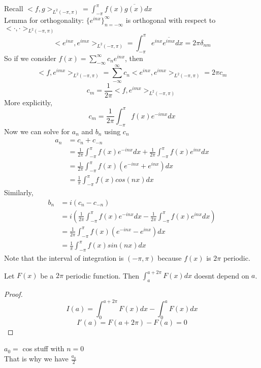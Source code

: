 \documentclass[answers,12pt,addpoints]{exam}
\begin{document}
Recall $<f,g>_{L^2(-\pi,\pi)} = \int_{-\pi}^{\pi} f(x) \overline{g(x)} dx$\\
Lemma for orthogonality: $\{e^{inx}\}_{n=-\infty}^{\infty}$ is orthogonal with respect to $<\cdot, \cdot>_{L^2(-\pi, \pi)}$\\
$$<e^{inx}, e^{imx}>_{L^2(-\pi, \pi)} = \int_{-\pi}^{\pi} e^{inx} \overline{e^{imx}} dx = 2\pi \delta_{nm}$$
So if we consider $f(x) = \sum_{-\infty}^{\infty} c_n e^{inx}$, then \\
$$ <f, e^{imx}>_{L^2(-\pi, \pi)} = \sum_{-\infty}^{\infty} c_n <e^{inx}, e^{imx}>_{L^2(-\pi, \pi)} = 2\pi c_m$$
$$c_m = \frac{1}{2\pi} <f, e^{imx}>_{L^2(-\pi, \pi)}$$
More explicitly, 
$$c_m = \frac{1}{2\pi} \int_{-\pi}^{\pi} f(x) e^{-imx} dx$$
Now we can solve for $a_n$ and $b_n$ using $c_n$\\
\begin{align*}
    a_n &= c_n + c_{-n}\\ 
    &= \frac{1}{2\pi} \int_{-\pi}^{\pi} f(x) e^{-inx} dx + \frac{1}{2\pi} \int_{-\pi}^{\pi} f(x) e^{inx} dx\\
    &= \frac{1}{2\pi} \int_{-\pi}^{\pi} f(x) (e^{-inx} + e^{inx}) dx\\
    &= \frac{1}{\pi} \int_{-\pi}^{\pi} f(x) cos(nx) dx
\end{align*}
Similarly,
\begin{align*}
    b_n &= i(c_n - c_{-n})\\
    &= i\left(\frac{1}{2\pi} \int_{-\pi}^{\pi} f(x) e^{-inx} dx - \frac{1}{2\pi} \int_{-\pi}^{\pi} f(x) e^{inx} dx\right)\\
    &= \frac{1}{2\pi} \int_{-\pi}^{\pi} f(x) (e^{-inx} - e^{inx}) dx\\
    &= \frac{1}{\pi} \int_{-\pi}^{\pi} f(x) sin(nx) dx
\end{align*}
Note that the interval of integration is $(-\pi, \pi)$ because $f(x)$ is $2\pi$ periodic.\\
\begin{lemma}
    Let $F(x)$ be a $2\pi$ periodic function. Then $\int_a^{a+2\pi} F(x) dx$ doesnt depend on $a$.
    \begin{proof}
        $$ I(a) = \int_0^{a+ 2\pi} F(x) dx - \int_0^{a} F(x) dx$$
        $$ I'(a) = F(a+2\pi) - F(a) = 0$$
    \end{proof}
\end{lemma}
\begin{remark}
    $a_0 =$ cos stuff with $n=0$\\
    That is why we have $\frac{a_0}{2}$
\end{remark}
\end{document}
